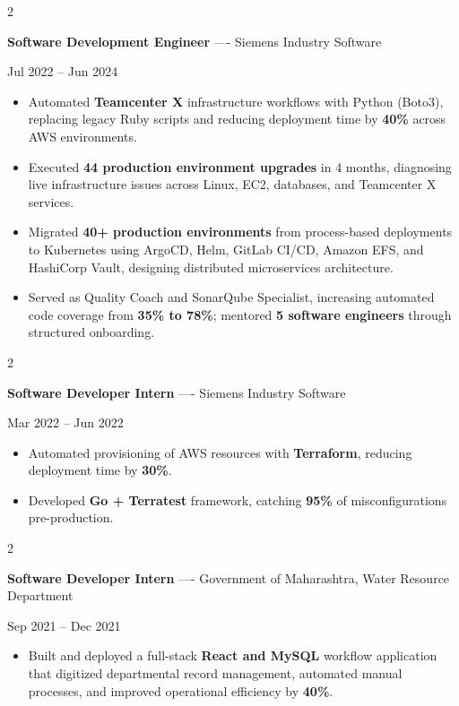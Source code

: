 \documentclass[10pt, letterpaper]{article}
\newenvironment{highlights}{
    \begin{itemize}[
        topsep=0.10 cm,
        parsep=0.06 cm,
        partopsep=0pt,
        itemsep=0.06 cm,
        leftmargin=12pt
    ]
}{
    \end{itemize}
}
\newenvironment{twocolentry}[2][]{
    \onecolentry
    \def\secondColumn{#2}
    \setcolumnwidth{\fill, 4.5 cm}
    \begin{paracol}{2}
}{
    \switchcolumn \raggedleft \secondColumn
    \end{paracol}
    \endonecolentry
}
\begin{document}
\vspace{0.15 cm}

\begin{twocolentry}{Jul 2022 -- Jun 2024}
\textbf{Software Development Engineer} ---- Siemens Industry Software
\end{twocolentry}
\begin{highlights}
  \item Automated \textbf{Teamcenter X} infrastructure workflows with Python (Boto3), replacing legacy Ruby scripts and reducing deployment time by \textbf{40\%} across AWS environments.
  \item Executed \textbf{44 production environment upgrades} in 4 months, diagnosing live infrastructure issues across Linux, EC2, databases, and Teamcenter X services.
  \item Migrated \textbf{40+ production environments} from process-based deployments to Kubernetes using ArgoCD, Helm, GitLab CI/CD, Amazon EFS, and HashiCorp Vault, designing distributed microservices architecture.
  \item Served as Quality Coach and SonarQube Specialist, increasing automated code coverage from \textbf{35\% to 78\%}; mentored \textbf{5 software engineers} through structured onboarding.
\end{highlights}

\vspace{0.15 cm}

\begin{twocolentry}{Mar 2022 -- Jun 2022}
\textbf{Software Developer Intern} ---- Siemens Industry Software
\end{twocolentry}
\begin{highlights}
  \item Automated provisioning of AWS resources with \textbf{Terraform}, reducing deployment time by \textbf{30\%}.
  \item Developed \textbf{Go + Terratest} framework, catching \textbf{95\%} of misconfigurations pre-production.
\end{highlights}

\vspace{0.15 cm}

\begin{twocolentry}{Sep 2021 -- Dec 2021}
\textbf{Software Developer Intern} ---- Government of Maharashtra, Water Resource Department
\end{twocolentry}
\begin{highlights}
  \item Built and deployed a full-stack \textbf{React and MySQL} workflow application that digitized departmental record management, automated manual processes, and improved operational efficiency by \textbf{40\%}.
\end{highlights}
\end{document}
